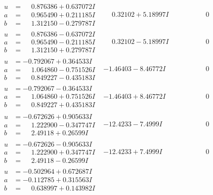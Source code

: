 \documentclass[1p]{elsarticle_modified}
\theoremstyle{definition}
\begin{document}
$$\begin{array}{c|c|c}
\begin{aligned}
u &= \phantom{-}0.876386 + 0.637072 I \\
a &= \phantom{-}0.965490 + 0.211185 I \\
b &= \phantom{-}1.312150 - 0.279787 I\end{aligned}
 & \phantom{-}0.32102 + 5.18997 I & \phantom{-0.000000 } 0 \\ \hline\begin{aligned}
u &= \phantom{-}0.876386 - 0.637072 I \\
a &= \phantom{-}0.965490 - 0.211185 I \\
b &= \phantom{-}1.312150 + 0.279787 I\end{aligned}
 & \phantom{-}0.32102 - 5.18997 I & \phantom{-0.000000 } 0 \\ \hline\begin{aligned}
u &= -0.792067 + 0.364533 I \\
a &= \phantom{-}1.064860 - 0.751526 I \\
b &= \phantom{-}0.849227 - 0.435183 I\end{aligned}
 & -1.46403 - 8.46772 I & \phantom{-0.000000 } 0 \\ \hline\begin{aligned}
u &= -0.792067 - 0.364533 I \\
a &= \phantom{-}1.064860 + 0.751526 I \\
b &= \phantom{-}0.849227 + 0.435183 I\end{aligned}
 & -1.46403 + 8.46772 I & \phantom{-0.000000 } 0 \\ \hline\begin{aligned}
u &= -0.672626 + 0.905633 I \\
a &= \phantom{-}1.222900 - 0.347747 I \\
b &= \phantom{-}2.49118 + 0.26599 I\end{aligned}
 & -12.4233 - 7.4999 I & \phantom{-0.000000 } 0 \\ \hline\begin{aligned}
u &= -0.672626 - 0.905633 I \\
a &= \phantom{-}1.222900 + 0.347747 I \\
b &= \phantom{-}2.49118 - 0.26599 I\end{aligned}
 & -12.4233 + 7.4999 I & \phantom{-0.000000 } 0 \\ \hline\begin{aligned}
u &= -0.502964 + 0.672687 I \\
a &= -0.112785 + 0.315563 I \\
b &= \phantom{-}0.638997 + 0.143982 I\end{aligned}

\end{array}$$
\end{document}
